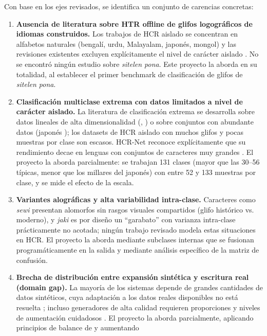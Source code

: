 \documentclass[conference]{IEEEtran}
\begin{document}
Con base en los ejes revisados, se identifica un conjunto de carencias
concretas:

\begin{enumerate}
  \item \textbf{Ausencia de literatura sobre HTR offline de glifos
  logográficos de idiomas construidos.} Los trabajos de HCR aislado se
  concentran en alfabetos naturales (bengalí, urdu, Malayalam, japonés,
  mongol) y las revisiones existentes excluyen explícitamente el nivel de
  carácter aislado \cite{garrido-munoz_handwritten_2026}. No se encontró
  ningún estudio sobre \textit{sitelen pona}. Este proyecto la aborda en su
  totalidad, al establecer el primer benchmark de clasificación de glifos de
  \textit{sitelen pona}.
  \item \textbf{Clasificación multiclase extrema con datos limitados a nivel
  de carácter aislado.} La literatura de clasificación extrema se desarrolla
  sobre datos lineales de alta dimensionalidad (\cite{bengio_extreme_2019},
  \cite{pdsparse_2016}) o sobre conjuntos con abundante datos (japonés
  \cite{ly_training_2018}); los datasets de HCR aislado con muchos glifos y
  pocas muestras por clase son escasos. HCR-Net reconoce explícitamente que
  su rendimiento decae en lenguas con conjuntos de caracteres muy grandes
  \cite{hcrnet_2024}. El proyecto la aborda parcialmente: se trabajan 131
  clases (mayor que las 30--56 típicas, menor que los millares del japonés)
  con entre 52 y 133 muestras por clase, y se mide el efecto de la escala.
  \item \textbf{Variantes alográficas y alta variabilidad intra-clase.}
  Caracteres como \textit{sewi} presentan alomorfos sin rasgos visuales
  compartidos (glifo histórico vs. moderno), y \textit{jaki} es por
  diseño un ``garabato'' con varianza intra-clase prácticamente no
  acotada; ningún trabajo revisado modela estas situaciones en HCR. El
  proyecto la aborda mediante subclases internas que se fusionan
  programáticamente en la salida y mediante análisis específico de la
  matriz de confusión.
  \item \textbf{Brecha de distribución entre expansión sintética y escritura
  real (domain gap).} La mayoría de los sistemas depende de grandes
  cantidades de datos sintéticos, cuya adaptación a los datos reales
  disponibles no está resuelta \cite{garrido-munoz_handwritten_2026}; incluso
  generadores de alta calidad requieren proporciones y niveles de aumentación
  cuidadosos \cite{wang_smartexp_2025}. El proyecto la aborda parcialmente,
  aplicando principios de balance de \cite{wang_smartexp_2025} y aumentando

\end{enumerate}
\end{document}
